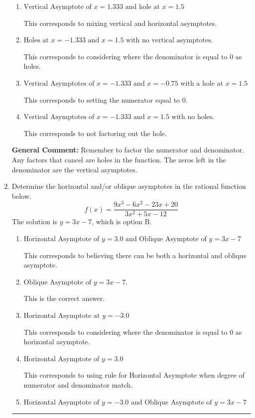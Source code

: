 \documentclass{extbook}[14pt]
\newcommand{\litem}[1]{\item #1

\rule{\textwidth}{0.4pt}}
\begin{document}
\begin{enumerate}
{\begin{enumerate}[label=\Alph*.]
This is the correct answer.
\item \( \text{Vertical Asymptote of } x = 1.333 \text{ and hole at } x = 1.5 \)

This corresponds to mixing vertical and horizontal asymptotes.
\item \( \text{Holes at } x = -1.333 \text{ and } x = 1.5 \text{ with no vertical asymptotes.} \)

This corresponds to considering where the denominator is equal to 0 as holes.
\item \( \text{Vertical Asymptotes of } x = -1.333 \text{ and } x = -0.75 \text{ with a hole at } x = 1.5 \)

This corresponds to setting the numerator equal to 0.
\item \( \text{Vertical Asymptotes of } x = -1.333 \text{ and } x = 1.5 \text{ with no holes.} \)

This corresponds to not factoring out the hole.
\end{enumerate}

\textbf{General Comment:} Remember to factor the numerator and denominator. Any factors that cancel are holes in the function. The zeros left in the denominator are the vertical asymptotes.
}
\litem{
Determine the horizontal and/or oblique asymptotes in the rational function below.
\[ f(x) = \frac{9x^{3} -6 x^{2} -23 x + 20}{3x^{2} +5 x -12} \]The solution is \( y = 3x -7 \), which is option B.\begin{enumerate}[label=\Alph*.]
\item \( \text{Horizontal Asymptote of } y = 3.0 \text{ and Oblique Asymptote of } y = 3x -7 \)

This corresponds to believing there can be both a horizontal and oblique asymptote.
\item \( \text{Oblique Asymptote of } y = 3x -7. \)

This is the correct answer.
\item \( \text{Horizontal Asymptote at } y = -3.0 \)

This corresponds to considering where the denominator is equal to 0 as horizontal asymptote.
\item \( \text{Horizontal Asymptote of } y = 3.0  \)

This corresponds to using rule for Horizontal Asymptote when degree of numerator and denominator match.
\item \( \text{Horizontal Asymptote of } y = -3.0 \text{ and Oblique Asymptote of } y = 3x -7 \)


\end{enumerate}}
\end{enumerate}
\end{document}
